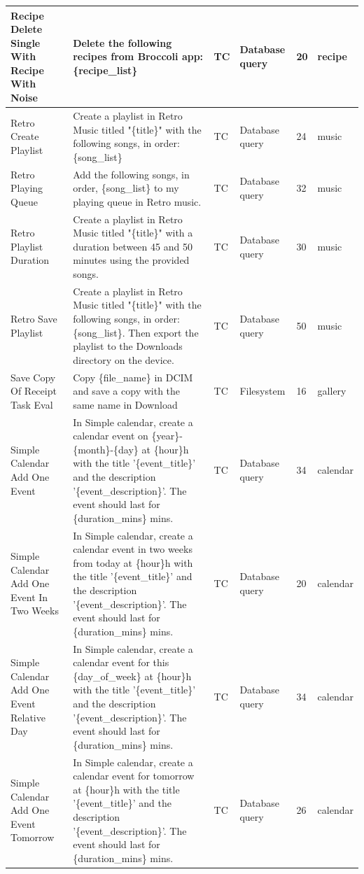 \documentclass{article}
\begin{document}
\begin{appendices}
\begin{longtable}{>{\RaggedRight\seqsplit}p{.8in}p{2in}p{.3in}p{.5in}p{.3in}p{.5in}}
\midrule
Recipe Delete Single With Recipe With Noise & Delete the following recipes from Broccoli app: \{recipe\_list\} & TC & Database query & 20 & recipe \\
\midrule
Retro Create Playlist & Create a playlist in Retro Music titled "\{title\}" with the following songs, in order: \{song\_list\} & TC & Database query & 24 & music \\
\midrule
Retro Playing Queue & Add the following songs, in order, \{song\_list\} to my playing queue in Retro music. & TC & Database query & 32 & music \\
\midrule
Retro Playlist Duration & Create a playlist in Retro Music titled "\{title\}" with a duration between 45 and 50 minutes using the provided songs. & TC & Database query & 30 & music \\
\midrule
Retro Save Playlist & Create a playlist in Retro Music titled "\{title\}" with the following songs, in order: \{song\_list\}. Then export the playlist to the Downloads directory on the device. & TC & Database query & 50 & music \\
\midrule
Save Copy Of Receipt Task Eval & Copy \{file\_name\} in DCIM and save a copy with the same name in Download & TC & Filesystem & 16 & gallery \\
\midrule
Simple Calendar Add One Event & In Simple calendar, create a calendar event on \{year\}-\{month\}-\{day\} at \{hour\}h with the title '\{event\_title\}' and the description '\{event\_description\}'. The event should last for \{duration\_mins\} mins. & TC & Database query & 34 & calendar \\
\midrule
Simple Calendar Add One Event In Two Weeks & In Simple calendar, create a calendar event in two weeks from today at \{hour\}h with the title '\{event\_title\}' and the description '\{event\_description\}'. The event should last for \{duration\_mins\} mins. & TC & Database query & 20 & calendar \\
\midrule
Simple Calendar Add One Event Relative Day & In Simple calendar, create a calendar event for this \{day\_of\_week\} at \{hour\}h with the title '\{event\_title\}' and the description '\{event\_description\}'. The event should last for \{duration\_mins\} mins. & TC & Database query & 34 & calendar \\
\midrule
Simple Calendar Add One Event Tomorrow & In Simple calendar, create a calendar event for tomorrow at \{hour\}h with the title '\{event\_title\}' and the description '\{event\_description\}'. The event should last for \{duration\_mins\} mins. & TC & Database query & 26 & calendar \\

\end{longtable}
\end{appendices}
\end{document}

